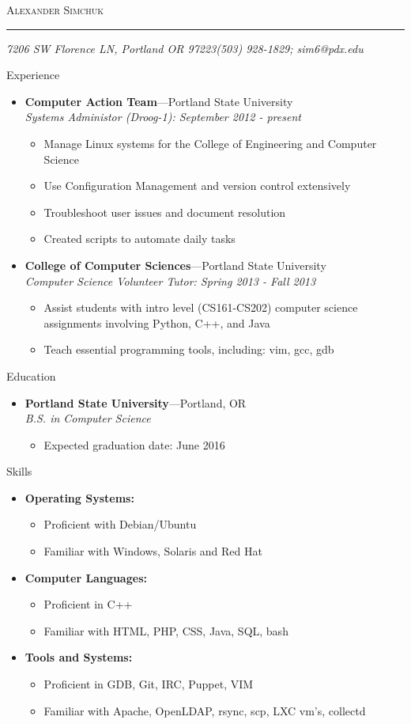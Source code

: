 \documentclass[11pt,oneside]{article}
\makeatletter
\newcommand{\name}{Alexander Simchuk}
\newcommand{\addr}{7206 SW Florence LN, Portland OR 97223}
\newcommand{\phone}{(503) 928-1829}
\newcommand{\email}{sim6@pdx.edu}
\newcommand{\bigname}[1]{
	\begin{center}\fontfamily{phv}\selectfont\Huge\scshape#1\end{center}
}
\newenvironment{ressection}[1]{
	\vspace{4pt}
	{\fontfamily{phv}\selectfont\Large#1}
	\begin{itemize}
	\vspace{3pt}
}{
	\end{itemize}
}
\newcommand{\resitem}[1]{
	\vspace{-4pt}
	\item \begin{flushleft} #1 \end{flushleft}
}
\newcommand{\ressubitem}[1]{
	\vspace{-1pt}
	\item \begin{flushleft} #1 \end{flushleft}
}
\newcommand{\resbigitem}[3]{
	\vspace{-5pt}
	\item
	\textbf{#1}---#2 \\
	\textit{#3}
}
\newenvironment{ressubsec}[3]{
	\resbigitem{#1}{#2}{#3}
	\vspace{-2pt}
	\begin{itemize}
}{
	\end{itemize}
}
\newenvironment{reslist}[1]{
	\resitem{\textbf{#1}}
	\vspace{-5pt}
	\begin{itemize}
}{
	\end{itemize}
}
\makeatother
\begin{document}
 \selectfont
\bigname{\name}
\vspace{-8pt} \rule{\textwidth}{1pt}
\vspace{-1pt} {\small\itshape \addr \hfill \phone; \email}
\vspace{8 pt}


\begin{ressection}{Experience}
    \begin{ressubsec}{Computer Action Team}{Portland State University}{Systems Administor (Droog-1): September 2012 - present}
		\ressubitem{Manage Linux systems for the College of Engineering and Computer Science}
		\ressubitem{Use Configuration Management and version control extensively}
		\ressubitem{Troubleshoot user issues and document resolution}
		\ressubitem{Created scripts to automate daily tasks}
	\end{ressubsec}
	\begin{ressubsec}{College of Computer Sciences}{Portland State University}{Computer Science Volunteer Tutor: Spring 2013 - Fall 2013}
        \ressubitem{Assist students with intro level (CS161-CS202) computer science assignments involving Python, C++, and Java}
        \ressubitem{Teach essential programming tools, including: vim, gcc, gdb}
	\end{ressubsec}
\end{ressection}


\begin{ressection}{Education}
    \begin{ressubsec}{Portland State University}{Portland, OR}{B.S. in Computer Science}
		\ressubitem{Expected graduation date: June 2016}
	\end{ressubsec}
\end{ressection}


\begin{ressection}{Skills}
    \begin{reslist}{Operating Systems:}
        \ressubitem{Proficient with Debian/Ubuntu}
        \ressubitem{Familiar with Windows, Solaris and Red Hat}
	\end{reslist}
	\begin{reslist}{Computer Languages:}
        \ressubitem{Proficient in C++}
        \ressubitem{Familiar with HTML, PHP, CSS, Java, SQL, bash}
	\end{reslist}
	\begin{reslist}{Tools and Systems:}
        \ressubitem{Proficient in GDB, Git, IRC, Puppet, VIM}
        \ressubitem{Familiar with Apache, OpenLDAP, rsync, scp, LXC vm's, collectd}
	\end{reslist}
\end{ressection}
\end{document}
